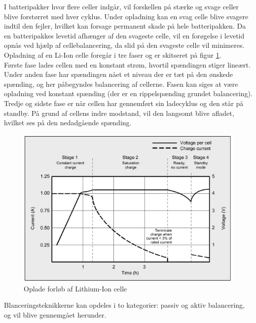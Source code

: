 I batteripakker hvor flere celler indgår, vil forskellen på stærke og svage celler blive forstørret med hver cyklus. Under opladning kan en svag celle blive svagere indtil den fejler, hvilket kan forsage permanent skade på hele batteripakken. Da en batteripakkes levetid afhænger af den svageste celle, vil en forøgelse i levetid opnås ved hjælp af cellebalancering, da slid på den svageste celle vil minimeres.
\\

Opladning af en Li-Ion celle foregår i tre faser og er skitseret på figur  \ref{fig:opladning_liion}.
\\
Første fase lades cellen med en konstant strøm, hvortil spændingen stiger lineært. 
\\
Under anden fase har spændingen nået et niveau der er tæt på den ønskede spænding, og her påbegyndes balancering af cellerne. Fasen kan siges at være opladning ved konstant spænding (der er en rippelspænding grundet balancering).
\\
Tredje og sidste fase er når cellen har gennemført sin ladecyklus og den står på standby. På grund af cellens indre modstand, vil den langsomt blive afladet, hvilket ses på den nedadgående spænding.

\begin{figure}[h]
	\centering
	\includegraphics[width=15cm]{billeder/liion_opladning.png}
	\caption{Oplade forløb af Lithium-Ion celle}
	\label{fig:opladning_liion}
\end{figure}

Blanceringsteknikkerne kan opdeles i to kategorier: passiv og aktiv balancering, og vil blive gennemgået herunder.

